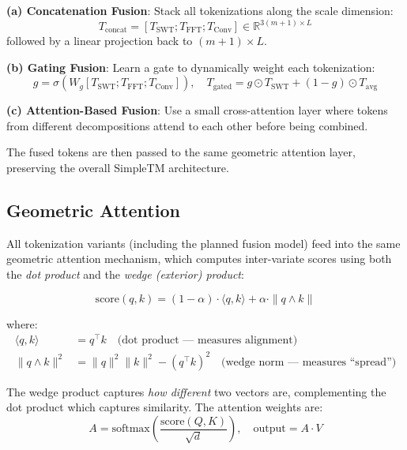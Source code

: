 \documentclass[12pt,a4paper]{article}
\begin{document}
\textbf{(a) Concatenation Fusion}: Stack all tokenizations along the scale dimension:
\begin{equation}
  T_\text{concat} = [T_\text{SWT}; T_\text{FFT}; T_\text{Conv}] \in \mathbb{R}^{3(m+1) \times L}
\end{equation}
followed by a linear projection back to $(m{+}1) \times L$.

\textbf{(b) Gating Fusion}: Learn a gate to dynamically weight each tokenization:
\begin{equation}
  g = \sigma(W_g [T_\text{SWT}; T_\text{FFT}; T_\text{Conv}]), \quad T_\text{gated} = g \odot T_\text{SWT} + (1-g) \odot T_\text{avg}
\end{equation}

\textbf{(c) Attention-Based Fusion}: Use a small cross-attention layer where tokens from different decompositions attend to each other before being combined.

The fused tokens are then passed to the same geometric attention layer, preserving the overall SimpleTM architecture.

\subsection{Geometric Attention}

All tokenization variants (including the planned fusion model) feed into the same geometric attention mechanism, which computes inter-variate scores using both the \textit{dot product} and the \textit{wedge (exterior) product}:

\begin{equation}
  \text{score}(q, k) = (1 - \alpha) \cdot \langle q, k \rangle + \alpha \cdot \|q \wedge k\|
\end{equation}

where:
\begin{align}
  \langle q, k \rangle &= q^\top k \quad \text{(dot product --- measures alignment)} \\
  \|q \wedge k\|^2 &= \|q\|^2 \|k\|^2 - (q^\top k)^2 \quad \text{(wedge norm --- measures ``spread'')}
\end{align}

The wedge product captures \textit{how different} two vectors are, complementing the dot product which captures similarity. The attention weights are:
\begin{equation}
  A = \text{softmax}\left(\frac{\text{score}(Q, K)}{\sqrt{d}}\right), \quad \text{output} = A \cdot V
\end{equation}
\end{document}
